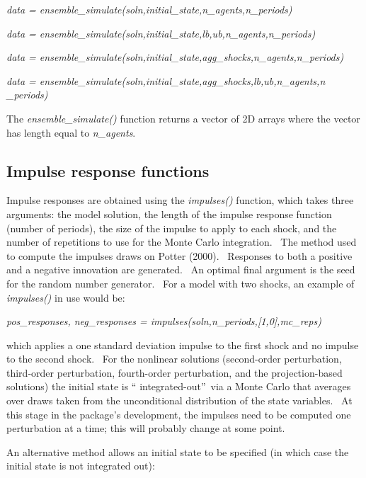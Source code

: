 \documentclass[notitlepage,11pt]{article}
\begin{document}
\bigskip

\textit{data = ensemble\_simulate(soln,initial\_state,n\_agents,n\_periods)}

\textit{data =
ensemble\_simulate(soln,initial\_state,lb,ub,n\_agents,n\_periods)}

\textit{data =
ensemble\_simulate(soln,initial\_state,agg\_shocks,n\_agents,n\_periods)}

\textit{data =
ensemble\_simulate(soln,initial\_state,agg\_shocks,lb,ub,n\_agents,n%
\_periods)}

\bigskip

The \textit{ensemble\_simulate()} function returns a vector of 2D arrays
where the vector has length equal to \textit{n\_agents}.

\subsection{Impulse response functions}

Impulse responses are obtained using the \textit{impulses()} function, which
takes three arguments: the model solution, the length of the impulse
response function (number of periods), the size of the impulse to apply to
each shock, and the number of repetitions to use for the Monte Carlo
integration. \ The method used to compute the impulses draws on Potter
(2000). \ Responses to both a positive and a negative innovation are
generated. \ An optimal final argument is the seed for the random number
generator. \ For a model with two shocks, an example of \textit{impulses()}
in use would be:

\bigskip

\textit{pos\_responses, neg\_responses =
impulses(soln,n\_periods,[1,0],mc\_reps)}

\bigskip

which applies a one standard deviation impulse to the first shock and no
impulse to the second shock. \ For the nonlinear solutions (second-order
perturbation, third-order perturbation, fourth-order perturbation, and the
projection-based solutions) the initial state is \textquotedblleft
integrated-out\textquotedblright\ via a Monte Carlo that averages over draws
taken from the unconditional distribution of the state variables. \ At this
stage in the package's development, the impulses need to be computed one
perturbation at a time; this will probably change at some point.

An alternative method allows an initial state to be specified (in which case
the initial state is not integrated out):
\end{document}
